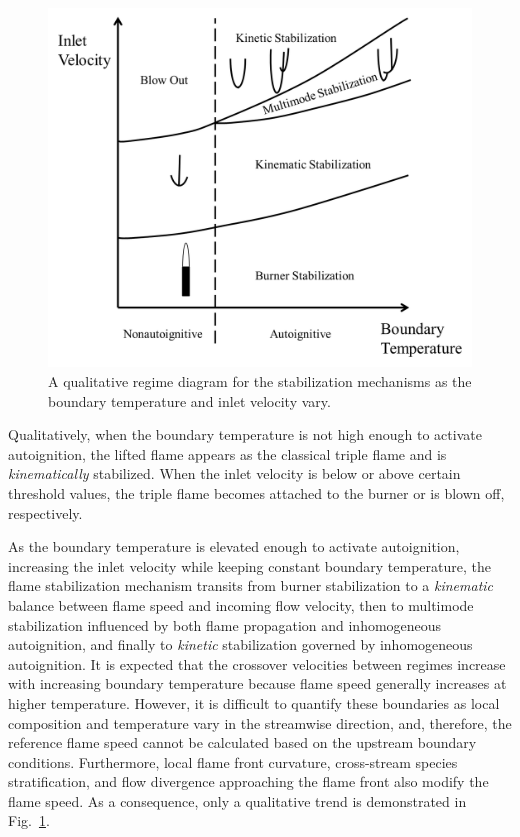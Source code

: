 \documentclass[review,3p,times]{elsarticle}
\begin{document}
\begin{figure}
  \centering
  \scriptsize
  \vspace{-0.1in}
  \includegraphics[width=1.0\textwidth]{2D-regime.png}
  \normalsize
  \vspace{-0.1in}
  \caption{A qualitative regime diagram for the stabilization mechanisms as the boundary temperature and inlet velocity vary. }
  \label{fig:2D-regime}
\end{figure}

Qualitatively, when the boundary temperature is not high enough to activate autoignition, the lifted flame appears as the classical triple flame and is \emph{kinematically} stabilized.  When the inlet velocity is below or above certain threshold values, the triple flame becomes attached to the burner or is blown off, respectively.  

As the boundary temperature is elevated enough to activate autoignition, increasing the inlet velocity while keeping constant boundary temperature, the flame stabilization mechanism transits from burner stabilization to a \emph{kinematic} balance between flame speed and incoming flow velocity, then to multimode stabilization influenced by both flame propagation and inhomogeneous autoignition, and finally to \emph {kinetic} stabilization governed by inhomogeneous autoignition.  It is expected that the crossover velocities between regimes increase with increasing boundary temperature because flame speed generally increases at higher temperature.  However, it is difficult to quantify these boundaries as local composition and temperature vary in the streamwise direction, and, therefore, the reference flame speed cannot be calculated based on the upstream boundary conditions.  Furthermore, local flame front curvature, cross-stream species stratification, and flow divergence approaching the flame front also modify the flame speed.  As a consequence, only a qualitative trend is demonstrated in Fig.~\ref{fig:2D-regime}.  
\end{document}
